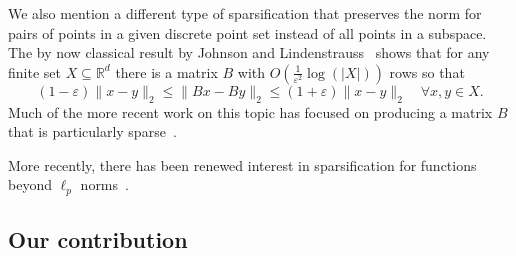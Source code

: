 \documentclass[12pt,english]{article}
\theoremstyle{theorem}
\theoremstyle{remark}
\providecommand{\setR}{\mathbb{R}}
\begin{document}
We also mention a different type of sparsification that preserves the norm for pairs of points in a given discrete point set instead of all points in a subspace.
The by now classical result by Johnson and Lindenstrauss~\cite{Johnson1984ExtensionsOL} shows that
for any finite set $X \subseteq \setR^d$ there is a matrix $B$ with $O(\frac{1}{\varepsilon^2}\log(|X|))$ rows so that
\[
 (1-\varepsilon) \|x-y\|_2 \leq \|Bx - By\|_2 \leq (1+\varepsilon) \|x-y\|_2 \quad \forall x,y \in X.
\]
Much of the more recent work on this topic has focused on producing a matrix $B$ that is particularly sparse~\cite{DasguptaKumarSarlosSTOC2010,KaneNelsonJACM14}.  

More recently, there has been renewed interest in sparsification for functions beyond $\ell_p$ norms~\cite{JLLS2023,JLLS2024}.

\subsection{Our contribution}
\end{document}
